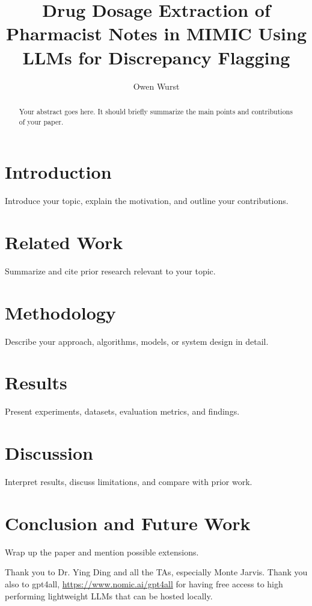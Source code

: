 \documentclass[sigconf]{acmart} %
\title[Notes Drug Extraction]{Drug Dosage Extraction of Pharmacist Notes in MIMIC Using LLMs for Discrepancy Flagging}
\author{Owen Wurst}
\affiliation{%
  \institution{University of Texas}
  \city{Austin}
  \state{Texas}
  \country{USA}
}
\begin{document}
\begin{abstract}
Your abstract goes here. It should briefly summarize the main points and contributions of your paper.
\end{abstract}


\maketitle

\section{Introduction}
Introduce your topic, explain the motivation, and outline your contributions.

\section{Related Work}
Summarize and cite prior research relevant to your topic.

\section{Methodology}
Describe your approach, algorithms, models, or system design in detail.

\section{Results}
Present experiments, datasets, evaluation metrics, and findings.

\section{Discussion}
Interpret results, discuss limitations, and compare with prior work.

\section{Conclusion and Future Work}
Wrap up the paper and mention possible extensions.

\begin{acks}
Thank you to Dr. Ying Ding and all the TAs, especially Monte Jarvis. Thank you also to gpt4all, \url{https://www.nomic.ai/gpt4all} for having free access to high performing lightweight LLMs that can be hosted locally.
\end{acks}



\nocite{*}
\end{document}
